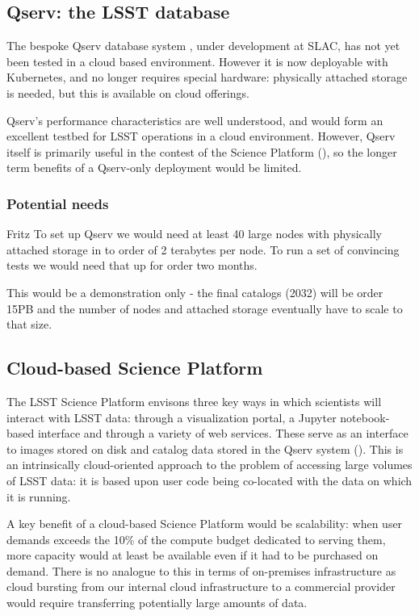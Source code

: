 \subsection{Qserv: the LSST database}\label{sect:qserv}

The bespoke Qserv database system , under development at SLAC, has not yet been tested in a cloud based environment.
However it is now deployable with Kubernetes, and no longer requires special hardware: physically attached storage is needed, but this is available on cloud offerings.

Qserv's performance characteristics are well understood, and would form an excellent testbed for LSST operations in a cloud environment.
However, Qserv itself is primarily useful in the contest of the Science Platform (), so the longer term benefits of a Qserv-only deployment would be limited.

\subsubsection{Potential needs} \label{sect:qservneeds}
{\color{red} Fritz }
To set up Qserv  we would need at least 40 large nodes with physically attached storage in to order of 2 terabytes per node.
To run a set of convincing tests we would need that up for order two months.

This would be a  demonstration only - the final catalogs (2032) will be order 15PB and the number of nodes and attached storage eventually have to scale to that size.

\subsection{Cloud-based Science Platform} \label{sect:platform}

The LSST Science Platform  envisons three key ways in which scientists will interact with LSST data: through a visualization portal, a Jupyter notebook-based interface and through a variety of web services.
These serve as an interface to images stored on disk and catalog data stored in the Qserv system ().
This is an intrinsically cloud-oriented approach to the problem of accessing large volumes of LSST data: it is based upon user code being co-located with the data on which it is running.

A key benefit of a cloud-based Science Platform would be scalability: when user demands exceeds the 10\% of the compute budget dedicated to serving them, more capacity would at least be available even if it had to be purchased on demand.
There is no analogue to this in terms of on-premises infrastructure as cloud bursting from our internal cloud infrastructure to a commercial provider would require transferring potentially large amounts of data.

